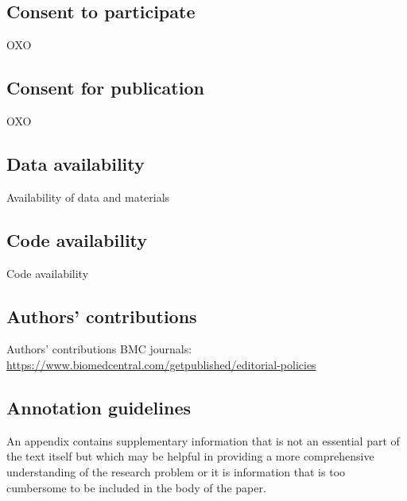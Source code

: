 \documentclass[sn-mathphys,Numbered]{sn-jnl}%
\theoremstyle{thmstyleone}%
\theoremstyle{thmstyletwo}%
\theoremstyle{thmstylethree}%
\begin{document}
\subsection*{Consent to participate}
%
OXO
%
%
%
\subsection*{Consent for publication}
%
OXO
%
%
%
\subsection*{Data availability}
%
Availability of data and materials
%
%
%
\subsection*{Code availability}
%
Code availability 
%
%
%
\subsection*{Authors' contributions}
%
Authors' contributions
BMC journals: \url{https://www.biomedcentral.com/getpublished/editorial-policies}
%
%
%
%
\begin{appendices}
%
%
%
\section{Annotation guidelines}\label{annot_guidelines}
%
An appendix contains supplementary information that is not an essential part of the text itself but which may be helpful in providing a more comprehensive understanding of the research problem or it is information that is too cumbersome to be included in the body of the paper.
%
%
%
\end{appendices}


\end{document}
